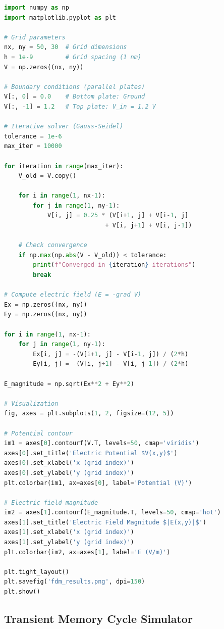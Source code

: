 \documentclass[12pt,a4paper]{report}
\begin{document}
\begin{lstlisting}[language=Python, caption=FDM solver for potential distribution, label=lst:fdm]
import numpy as np
import matplotlib.pyplot as plt

# Grid parameters
nx, ny = 50, 30  # Grid dimensions
h = 1e-9         # Grid spacing (1 nm)
V = np.zeros((nx, ny))

# Boundary conditions (parallel plates)
V[:, 0] = 0.0    # Bottom plate: Ground
V[:, -1] = 1.2   # Top plate: V_in = 1.2 V

# Iterative solver (Gauss-Seidel)
tolerance = 1e-6
max_iter = 10000

for iteration in range(max_iter):
    V_old = V.copy()

    for i in range(1, nx-1):
        for j in range(1, ny-1):
            V[i, j] = 0.25 * (V[i+1, j] + V[i-1, j] 
                            + V[i, j+1] + V[i, j-1])

    # Check convergence
    if np.max(np.abs(V - V_old)) < tolerance:
        print(f"Converged in {iteration} iterations")
        break

# Compute electric field (E = -grad V)
Ex = np.zeros((nx, ny))
Ey = np.zeros((nx, ny))

for i in range(1, nx-1):
    for j in range(1, ny-1):
        Ex[i, j] = -(V[i+1, j] - V[i-1, j]) / (2*h)
        Ey[i, j] = -(V[i, j+1] - V[i, j-1]) / (2*h)

E_magnitude = np.sqrt(Ex**2 + Ey**2)

# Visualization
fig, axes = plt.subplots(1, 2, figsize=(12, 5))

# Potential contour
im1 = axes[0].contourf(V.T, levels=50, cmap='viridis')
axes[0].set_title('Electric Potential $V(x,y)$')
axes[0].set_xlabel('x (grid index)')
axes[0].set_ylabel('y (grid index)')
plt.colorbar(im1, ax=axes[0], label='Potential (V)')

# Electric field magnitude
im2 = axes[1].contourf(E_magnitude.T, levels=50, cmap='hot')
axes[1].set_title('Electric Field Magnitude $|E(x,y)|$')
axes[1].set_xlabel('x (grid index)')
axes[1].set_ylabel('y (grid index)')
plt.colorbar(im2, ax=axes[1], label='E (V/m)')

plt.tight_layout()
plt.savefig('fdm_results.png', dpi=150)
plt.show()
\end{lstlisting}

\subsection{Transient Memory Cycle Simulator}
\end{document}

